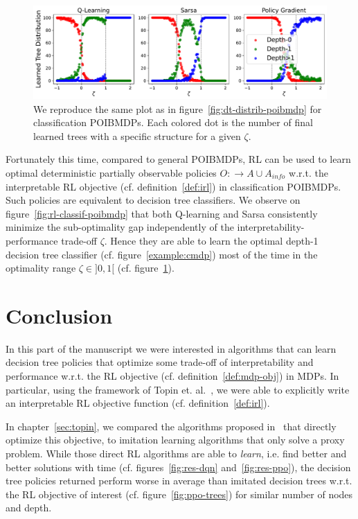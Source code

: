 \begin{figure}
    \centering
    \includegraphics[width=1\textwidth]{images/images_part1/tree_distributions_classif.pdf}
    \caption{We reproduce the same plot as in figure~\ref{fig:dt-distrib-poibmdp} for classification POIBMDPs. Each colored dot is the number of final learned trees with a specific structure for a given $\zeta$.}\label{fig:tree-distrib-classif-poibmdp}
\end{figure}

Fortunately this time, compared to general POIBMDPs, RL can be used to learn optimal deterministic partially observable policies $O:\rightarrow A\cup A_{info}$ w.r.t. the interpretable RL objective (cf. definition~\ref{def:irl}) in classification POIBMDPs.
Such policies are equivalent to decision tree classifiers.
We observe on figure~\ref{fig:rl-classif-poibmdp} that both Q-learning and Sarsa consistently minimize the sub-optimality gap independently of the interpretability-performance trade-off $\zeta$. 
Hence they are able to learn the optimal depth-1 decision tree classifier (cf. figure~\ref{example:cmdp}) most of the time in the optimality range $\zeta\in ]0, 1[$ (cf. figure~\ref{fig:tree-distrib-classif-poibmdp}).


\section{Conclusion}\label{sec:ccl-pomdp}
In this part of the manuscript we were interested in algorithms that can learn decision tree policies that optimize some trade-off of interpretability and performance w.r.t. the RL objective (cf. definition~\ref{def:mdp-obj}) in MDPs.
In particular, using the framework of Topin et. al.~\cite{topin2021iterative}, we were able to explicitly write an interpretable RL objective function (cf. definition~\ref{def:irl}).

In chapter~\ref{sec:topin}, we compared the algorithms proposed in~\cite{topin2021iterative} that directly optimize this objective, to imitation learning algorithms that only solve a proxy problem.
While those direct RL algorithms are able to \textit{learn}, i.e. find better and better solutions with time (cf. figures~\ref{fig:res-dqn} and~\ref{fig:res-ppo}), the decision tree policies returned perform worse in average than imitated decision trees w.r.t. the RL objective of interest (cf. figure~\ref{fig:ppo-trees}) for similar number of nodes and depth.

